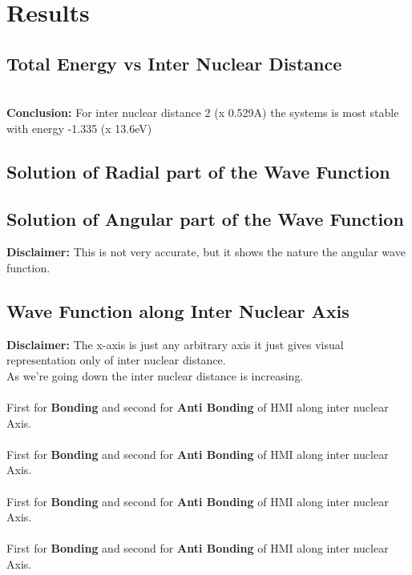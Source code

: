 \documentclass[12pt]{report}
\begin{document}
\chapter{Results}
	\section{Total Energy vs Inter Nuclear Distance}
		{}\\
		\normalsize \textbf{Conclusion:} For inter nuclear distance 2 (x 0.529A) the systems is most stable with energy -1.335 (x 13.6eV)
	\section{Solution of Radial part of the Wave Function}
		{}
	\section{Solution of Angular part of the Wave Function}
		{}
		\normalsize \textbf{Disclaimer:} This is not very accurate, but it shows the nature the angular wave function. 
	\section{Wave Function along Inter Nuclear Axis}
		\normalsize \textbf{Disclaimer:} The x-axis is just any arbitrary axis it just gives visual representation only of inter nuclear distance. \\
		\normalsize As we're going down the inter nuclear distance is increasing.\\
		{}
		{}\\
		\normalsize First for \textbf{Bonding} and second for \textbf{Anti Bonding} of HMI along inter nuclear Axis.\\
		{}
		{}\\
		\normalsize First for \textbf{Bonding} and second for \textbf{Anti Bonding} of HMI along inter nuclear Axis.\\
		{}
		{}\\
		\normalsize First for \textbf{Bonding} and second for \textbf{Anti Bonding} of HMI along inter nuclear Axis.\\
		{}
		{}\\
		\normalsize First for \textbf{Bonding} and second for \textbf{Anti Bonding} of HMI along inter nuclear Axis.\\
\end{document}
